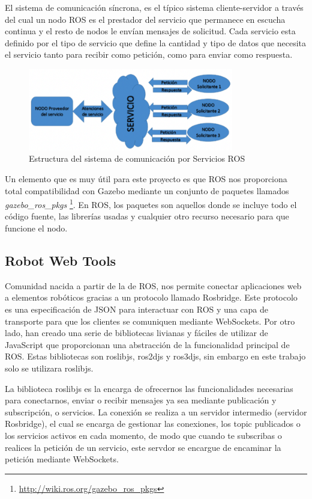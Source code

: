 El sistema de comunicación síncrona, es el típico sistema cliente-servidor a través del cual un nodo ROS es el prestador del servicio que permanece en escucha continua y el resto de nodos le envían mensajes de solicitud. Cada servicio esta definido por el tipo de servicio que define la cantidad y tipo de datos que necesita el servicio tanto para recibir como petición, como para enviar como respuesta.

\begin{figure}[H]
  \begin{center}
    \includegraphics[width=0.8\textwidth]{figures/serviciosros.png}
		\caption{Estructura del sistema de comunicación por Servicios ROS}
		\label{fig.serviciosros}
		\end{center}
\end{figure}

Un elemento que es muy útil para este proyecto es que ROS nos proporciona total compatibilidad con Gazebo mediante un conjunto de paquetes llamados \textit{gazebo\_ros\_pkgs} \footnote{\url{http://wiki.ros.org/gazebo_ros_pkgs}}. En ROS, los paquetes son aquellos donde se incluye todo el código fuente, las librerías usadas y cualquier otro recurso necesario para que funcione el nodo.

\subsection{Robot Web Tools}
Comunidad nacida a partir de la de ROS, nos permite conectar aplicaciones web a elementos robóticos gracias a un protocolo llamado Rosbridge. Este protocolo es una especificación de JSON para interactuar con ROS y una capa de transporte para que los clientes se comuniquen mediante WebSockets. Por otro lado, han creado una serie de bibliotecas livianas y fáciles de utilizar de JavaScript que proporcionan una  abstracción de la funcionalidad principal de ROS. Estas bibliotecas son roslibjs, ros2djs y ros3djs, sin embargo en este trabajo solo se utilizara roslibjs.

La biblioteca roslibjs es la encarga de ofrecernos las funcionalidades necesarias para conectarnos, enviar o recibir mensajes ya sea mediante publicación y subscripción, o servicios. La conexión se realiza a un servidor intermedio (servidor Rosbridge), el cual se encarga de gestionar las conexiones, los topic publicados o los servicios activos en cada momento, de modo que cuando te subscribas o realices la petición de un servicio, este servdor se encargue de encaminar la petición mediante WebSockets.

